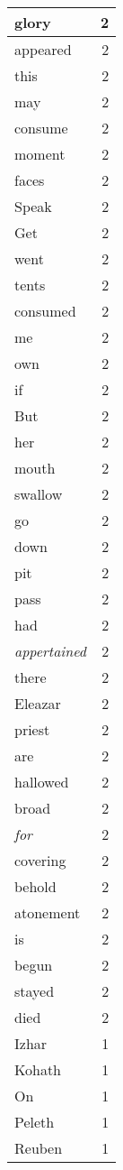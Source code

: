 \begin{center}
\begin{longtable}{l|r}
glory & 2 \\ \hline
appeared & 2 \\ \hline
this & 2 \\ \hline
may & 2 \\ \hline
consume & 2 \\ \hline
moment & 2 \\ \hline
faces & 2 \\ \hline
Speak & 2 \\ \hline
Get & 2 \\ \hline
went & 2 \\ \hline
tents & 2 \\ \hline
consumed & 2 \\ \hline
me & 2 \\ \hline
own & 2 \\ \hline
if & 2 \\ \hline
But & 2 \\ \hline
her & 2 \\ \hline
mouth & 2 \\ \hline
swallow & 2 \\ \hline
go & 2 \\ \hline
down & 2 \\ \hline
pit & 2 \\ \hline
pass & 2 \\ \hline
had & 2 \\ \hline
\emph{appertained} & 2 \\ \hline
there & 2 \\ \hline
Eleazar & 2 \\ \hline
priest & 2 \\ \hline
are & 2 \\ \hline
hallowed & 2 \\ \hline
broad & 2 \\ \hline
\emph{for} & 2 \\ \hline
covering & 2 \\ \hline
behold & 2 \\ \hline
atonement & 2 \\ \hline
is & 2 \\ \hline
begun & 2 \\ \hline
stayed & 2 \\ \hline
died & 2 \\ \hline
Izhar & 1 \\ \hline
Kohath & 1 \\ \hline
On & 1 \\ \hline
Peleth & 1 \\ \hline
Reuben & 1 \\ \hline

\end{longtable}
\end{center}
